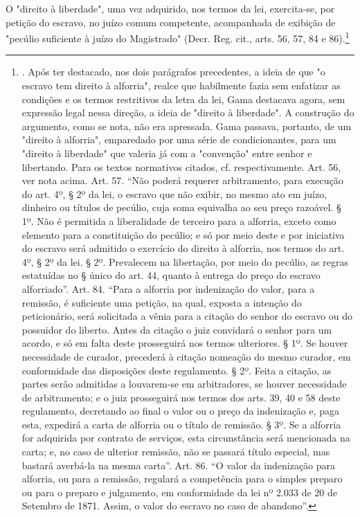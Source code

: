 O "direito à liberdade", uma vez adquirido, nos termos da lei,
exercita-se, por petição do escravo, no juízo comum competente,
acompanhada de exibição de "pecúlio suficiente à juízo do Magistrado"
(Decr. Reg. cit., arts. 56, 57, 84 e 86).\footnote{. Após ter destacado,
  nos dois parágrafos precedentes, a ideia de que "o escravo tem direito
  à alforria", realce que habilmente fazia sem enfatizar as condições e
  os termos restritivos da letra da lei, Gama destacava agora, sem
  expressão legal nessa direção, a ideia de "direito à liberdade". A
  construção do argumento, como se nota, não era apressada. Gama
  passava, portanto, de um "direito à alforria", emparedado por uma
  série de condicionantes, para um "direito à liberdade" que valeria já
  com a "convenção" entre senhor e libertando. Para os textos normativos
  citados, cf. respectivamente. Art. 56, ver nota acima. Art. 57. ``Não
  poderá requerer arbitramento, para execução do art. 4º, § 2º da lei, o
  escravo que não exibir, no mesmo ato em juízo, dinheiro ou títulos de
  pecúlio, cuja soma equivalha ao seu preço razoável. § 1º. Não é
  permitida a liberalidade de terceiro para a alforria, exceto como
  elemento para a constituição do pecúlio; e só por meio deste e por
  iniciativa do escravo será admitido o exercício do direito à alforria,
  nos termos do art. 4º, § 2º da lei. § 2º. Prevalecem na libertação,
  por meio do pecúlio, as regras estatuídas no § único do art. 44,
  quanto à entrega do preço do escravo alforriado''. Art. 84. ``Para a
  alforria por indenização do valor, para a remissão, é suficiente uma
  petição, na qual, exposta a intenção do peticionário, será solicitada
  a vênia para a citação do senhor do escravo ou do possuidor do
  liberto. Antes da citação o juiz convidará o senhor para um acordo, e
  só em falta deste prosseguirá nos termos ulteriores. § 1º. Se houver
  necessidade de curador, precederá à citação nomeação do mesmo curador,
  em conformidade das disposições deste regulamento. § 2º. Feita a
  citação, as partes serão admitidas a louvarem-se em arbitradores, se
  houver necessidade de arbitramento; e o juiz prosseguirá nos termos
  dos arts. 39, 40 e 58 deste regulamento, decretando ao final o valor
  ou o preço da indenização e, paga esta, expedirá a carta de alforria
  ou o título de remissão. § 3º. Se a alforria for adquirida por
  contrato de serviços, esta circunstância será mencionada na carta; e,
  no caso de ulterior remissão, não se passará título especial, mas
  bastará averbá-la na mesma carta''. Art. 86. ``O valor da indenização
  para alforria, ou para a remissão, regulará a competência para o
  simples preparo ou para o preparo e julgamento, em conformidade da lei
  nº 2.033 de 20 de Setembro de 1871. Assim, o valor do escravo no caso
  de abandono''.}

